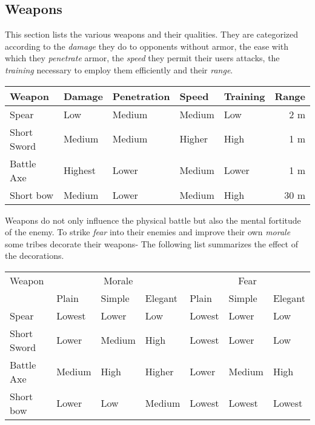 \subsection{Weapons}\label{ch:Goods:Armory:Weapons}
This section lists the various weapons and their qualities. They are
categorized according to the \emph{damage} they do to opponents without armor,
the ease with which they \emph{penetrate} armor, the \emph{speed} they permit
their users attacks, the \emph{training} necessary to employ them efficiently
and their \emph{range}.

\begin{longtable}{lllllr}
	\toprule
	Weapon
	       & Damage  & Penetration
	       & Speed   & Training    & Range \\
	\midrule
	Spear
	       & Low     & Medium
	       & Medium  & Low         & 2 m   \\
	Short Sword
	       & Medium  & Medium
	       & Higher  & High        & 1 m   \\
	Battle Axe
	       & Highest & Lower
	       & Medium  & Lower       & 1 m   \\
	Short bow
	       & Medium  & Lower       &
	Medium & High    & 30 m                \\
	\bottomrule
\end{longtable}

Weapons do not only influence the physical battle but also the mental fortitude
of the enemy. To strike \emph{fear} into their enemies and improve their own
\emph{morale} some tribes decorate their weapons- The following list summarizes
the effect of the decorations.

\begin{longtable}{l ll ll ll}
	\toprule
	Weapon
	 & \multicolumn{3}{c}{Morale}
	 & \multicolumn{3}{c}{Fear}
	\\
	 & Plain                      & Simple & Elegant
	 & Plain                      & Simple & Elegant \\
	\midrule
	Spear
	 & Lowest                     & Lower  & Low
	 & Lowest                     & Lower  & Low     \\
	Short Sword
	 & Lower                      & Medium & High
	 & Lowest                     & Lower  & Low     \\
	Battle Axe
	 & Medium                     & High   & Higher
	 & Lower                      & Medium & High    \\
	Short bow
	 & Lower                      & Low    & Medium
	 & Lowest                     & Lowest & Lowest  \\
	\bottomrule
\end{longtable}

